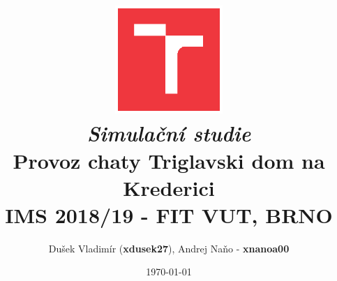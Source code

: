 \documentclass[a4paper,11pt]{article}
\title{\includegraphics[width=4.1cm,keepaspectratio,trim={1.2cm 1.2cm 1.2cm 1.2cm},clip]{vut-logo} \\
\vspace{4cm}
\textit{Simulační studie} \\
\textbf{Provoz chaty Triglavski dom na Krederici} \\
\vspace{0.5cm}
\textsc{IMS 2018/19 - FIT VUT, BRNO}}
\author{Dušek Vladimír (\textbf{xdusek27}), Andrej Naňo - \textbf{xnanoa00}}
\date{\today}
\begin{document}
\newpage
\maketitle
\newpage


\renewcommand{\contentsname}{Obsah}
\tableofcontents


\end{document}
